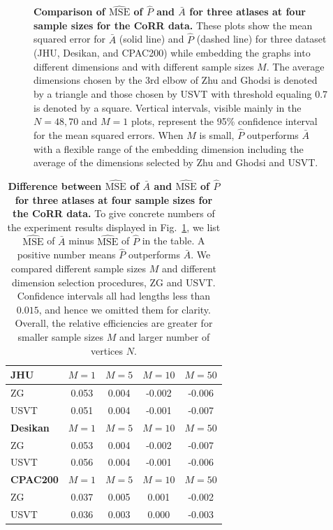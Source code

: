 \documentclass[10pt,letterpaper]{article}
\renewcommand{\hat}{\widehat}
\begin{document}
\begin{figure}[!htbp]
\caption{{\bf Comparison of $\hat{\mathrm{MSE}}$ of $\hat{P}$ and $\bar{A}$ for three atlases at four sample sizes for the CoRR data.}
These plots show the mean squared error for $\bar{A}$ (solid line) and $\hat{P}$ (dashed line) for three dataset (JHU, Desikan, and CPAC200) while embedding the graphs into different dimensions and with different sample sizes $M$. The average dimensions chosen by the 3rd elbow of Zhu and Ghodsi is denoted by a triangle
 and those chosen by USVT with threshold equaling 0.7 is denoted by a square.
 Vertical intervals, visible mainly in the $N=48,70$ and $M=1$ plots, represent the 95\% confidence interval for the mean squared errors.  When $M$ is small, $\hat{P}$ outperforms $\bar{A}$ with a flexible range of the embedding dimension including the average of the dimensions selected by Zhu and Ghodsi and USVT.}
\label{fig:realdata}
\end{figure}


\begin{table}[!tb]
    \centering
\begin{tabular}{lcccc}\toprule
\multicolumn{1}{l}{\textbf{JHU}} & $M=1$  & $M=5$  & $M=10$ & $M=50$  \\\midrule
ZG      & 0.053 & 0.004 & -0.002 & -0.006  \\
USVT    & 0.051 & 0.004 & -0.001 & -0.007 \\\midrule
\multicolumn{1}{l}{\textbf{Desikan}} & $M=1$  & $M=5$  & $M=10$ & $M=50$  \\ \midrule
ZG      & 0.053 & 0.004 & -0.002 & -0.007 \\
USVT    & 0.056 & 0.004 & -0.001 & -0.006 \\\midrule
\multicolumn{1}{l}{\textbf{CPAC200}} & $M=1$  & $M=5$  & $M=10$ & $M=50$  \\\midrule
ZG      & 0.037 & 0.005 & 0.001 & -0.002 \\
USVT    & 0.036 & 0.003 & 0.000 & -0.003 \\\bottomrule
\end{tabular}
    \caption{{\bf Difference between $\hat{\mathrm{MSE}}$ of $\bar{A}$ and $\hat{\mathrm{MSE}}$ of $\hat{P}$ for three atlases at four sample sizes for the CoRR data.}
    To give concrete numbers of the experiment results displayed in Fig.~\ref{fig:realdata}, we list $\hat{\mathrm{MSE}}$ of $\bar{A}$ minus $\hat{\mathrm{MSE}}$ of $\hat{P}$ in the table. A positive number means $\hat{P}$ outperforms $\bar{A}$.
     We compared different sample sizes $M$ and different dimension selection procedures, ZG and USVT.
    Confidence intervals all had lengths less than $0.015$, and hence we omitted them for clarity.
    Overall, the relative efficiencies are greater for smaller sample sizes $M$ and larger number of vertices $N$. 
    } 
    \label{tab:corr_mse}
\end{table}
\end{document}
